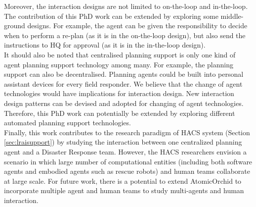 Moreover, the interaction designs are not limited to on-the-loop and in-the-loop. The contribution of this PhD work can be extended by exploring some middle-ground designs. For example, the agent can be given the responsibility to decide when to perform a re-plan (as it is in the on-the-loop design), but also send the instructions to HQ for approval (as it is in the in-the-loop design).\\

It should also be noted that centralised planning support is only one kind of agent planning support technology among many. For example, the planning support can also be decentralised. Planning agents could be built into personal assistant devices for every field responder. We believe that the change of agent technologies would have implications for interaction design. New interaction design patterns can be devised and adopted for changing of agent technologies. Therefore, this PhD work can potentially be extended by exploring different automated planning support technologies.\\ 

Finally, this work contributes to the research paradigm of \acf{HACS} system (Section \ref{sec:lraisupport}) by studying the interaction between one centralized planning agent and a Disaster Response team. However, the \ac{HACS} researchers envision a scenario in which large number of computational entities (including both software agents and embodied agents such as rescue robots) and human teams collaborate at large scale. For future work, there is a potential to extend AtomicOrchid to incorporate multiple agent and human teams to study multi-agents and human interaction.\\




